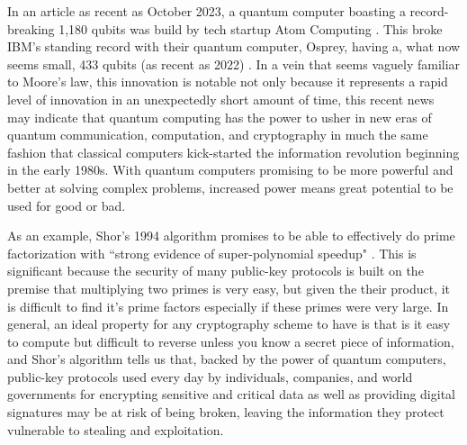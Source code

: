 In an article as recent as October 2023, a quantum computer boasting a record-breaking 1,180 qubits was build by tech startup Atom Computing \cite{atom_computing}. This broke IBM's standing record with their quantum computer, Osprey, having a, what now seems small, 433 qubits (as recent as 2022) \cite{osprey}. In a vein that seems vaguely familiar to Moore's law, this innovation is notable not only because it represents a rapid level of innovation in an unexpectedly short amount of time, this recent news may indicate that quantum computing has the power to usher in new eras of quantum communication, computation, and cryptography in much the same fashion that classical computers kick-started the information revolution beginning in the early 1980s. With quantum computers promising to be more powerful and better at solving complex problems, increased power means great potential to be used for good or bad. 

As an example, Shor's 1994 algorithm promises to be able to effectively do prime factorization with ``strong evidence of super-polynomial speedup" \cite{wiki_shor}. This is significant because the security of many public-key protocols is built on the premise that multiplying two primes is very easy, but given the their product, it is difficult to find it's prime factors especially if these primes were very large. In general, an ideal property for any cryptography scheme to have is that is it easy to compute but difficult to reverse unless you know a secret piece of information, and Shor's algorithm tells us that, backed by the power of quantum computers, public-key protocols used every day by individuals, companies, and world governments for encrypting sensitive and critical data as well as providing digital signatures may be at risk of being broken, leaving the information they protect vulnerable to stealing and exploitation.

